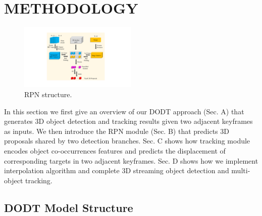 \documentclass[letterpaper, 10 pt, conference]{ieeeconf}  %
\begin{document}

\section{METHODOLOGY}

\begin{figure}
	\vspace{-0.6cm}
	\rule{0pt}{1ex}
	\begin{center}
		\includegraphics[trim={7.5cm, 2cm, 8.5cm, 2cm}, clip,width=0.5\textwidth]{images/rpn.pdf}
	\end{center}
	\caption{RPN structure.}
	\label{fig:rpn}
	\vspace{-0.5cm}
\end{figure}

In this section we first give an overview of our DODT approach (Sec. A) that generates 3D object detection and tracking results given two adjacent keyframes as inputs. We then introduce the RPN module (Sec. B) that predicts 3D proposals shared by two detection branches. Sec. C shows how tracking module encodes object co-occurrences features and predicts the displacement of corresponding targets in two adjacent keyframes. Sec. D shows how we implement interpolation algorithm and complete 3D streaming object detection and multi-object tracking.

\subsection{DODT Model Structure} 
\end{document}
